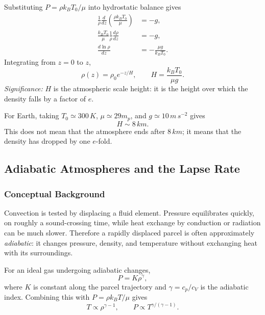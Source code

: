 Substituting $P=\rho k_B T_0/\mu$ into hydrostatic balance gives
\begin{align}
    \frac{1}{\rho}\frac{d}{dz}
    \left(\frac{\rho k_B T_0}{\mu}\right)
    &= -g ,
    \label{eq:lec07:isothermal-step1}\\
    \frac{k_B T_0}{\mu}\frac{1}{\rho}\frac{d\rho}{dz}
    &= -g ,
    \label{eq:lec07:isothermal-step2}\\
    \frac{d\ln\rho}{dz}
    &= -\frac{\mu g}{k_B T_0}.
    \label{eq:lec07:isothermal-step3}
\end{align}
Integrating from $z=0$ to $z$,
\begin{equation}
    \boxed{
    \rho(z)=\rho_0 e^{-z/H},
    \qquad
    H=\frac{k_B T_0}{\mu g}.
    }
    \label{eq:lec07:isothermal-atmosphere}
\end{equation}
\textit{Significance:} $H$ is the atmospheric scale height: it is the height
over which the density falls by a factor of $e$.

For Earth, taking $T_0\simeq300\,\si{K}$, $\mu\simeq 29m_p$, and
$g\simeq10\,\si{m\,s^{-2}}$ gives
\begin{equation}
    H \sim 8\,\si{km}.
    \label{eq:lec07:earth-scale-height}
\end{equation}
This does not mean that the atmosphere ends after $8\,\si{km}$; it means that
the density has dropped by one $e$-fold.

\subsection{Adiabatic Atmospheres and the Lapse Rate}
\label{sec:lec07:adiabatic-atmosphere}

\subsubsection*{Conceptual Background}
Convection is tested by displacing a fluid element. Pressure equilibrates
quickly, on roughly a sound-crossing time, while heat exchange by conduction or
radiation can be much slower. Therefore a rapidly displaced parcel is often
approximately \emph{adiabatic}: it changes pressure, density, and temperature
without exchanging heat with its surroundings.

For an ideal gas undergoing adiabatic changes,
\begin{equation}
    P = K\rho^\gamma ,
    \label{eq:lec07:adiabatic-relation}
\end{equation}
where $K$ is constant along the parcel trajectory and
$\gamma=c_p/c_V$ is the adiabatic index. Combining this with
$P=\rho k_B T/\mu$ gives
\begin{equation}
    T \propto \rho^{\gamma-1},
    \qquad
    P \propto T^{\gamma/(\gamma-1)} .
    \label{eq:lec07:T-rho-adiabatic}
\end{equation}

